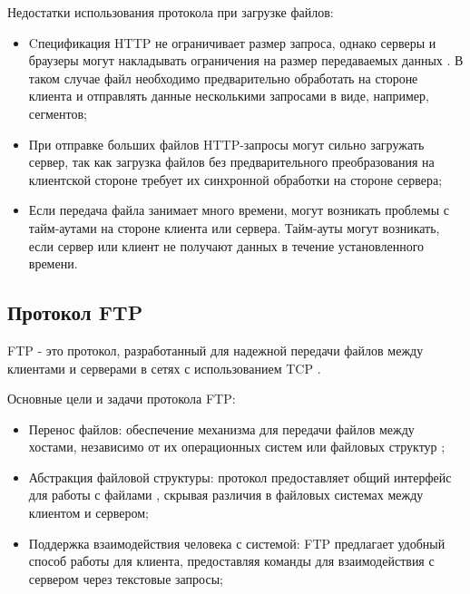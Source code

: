 	 Недостатки использования протокола при загрузке файлов:
	\begin{itemize}[label=$\bullet$]
		\item Cпецификация HTTP не ограничивает размер запроса, однако серверы и браузеры могут накладывать ограничения на размер передаваемых данных \cite{rfcHttp10}. В таком случае файл необходимо предварительно обработать на стороне клиента и отправлять данные несколькими запросами в виде, например, сегментов;
		\item При отправке больших файлов HTTP-запросы могут сильно загружать сервер, так как загрузка файлов без предварительного преобразования на клиентской стороне требует их синхронной обработки на стороне сервера;
		\item Если передача файла занимает много времени, могут возникать проблемы с тайм-аутами на стороне клиента или сервера. Тайм-ауты могут возникать, если сервер или клиент не получают данных в течение установленного времени.
	\end{itemize}

\subsection{Протокол FTP}
	FTP - это протокол, разработанный для надежной передачи файлов
	между клиентами и серверами в сетях с использованием TCP \cite{rfcFtp}.
	
	Основные цели и задачи протокола FTP:
	\begin{itemize}[label=$\bullet$]
		\item Перенос файлов: обеспечение механизма для передачи файлов между хостами, независимо от их операционных систем или файловых структур \cite{rfcFtp};
		\item Абстракция файловой структуры: протокол предоставляет общий интерфейс для работы с файлами \cite{rfcFtp}, скрывая различия в файловых системах между клиентом и сервером;
		\item Поддержка взаимодействия человека с системой: FTP предлагает удобный способ работы для клиента, предоставляя команды для взаимодействия с сервером через текстовые запросы;
	\end{itemize}
	
